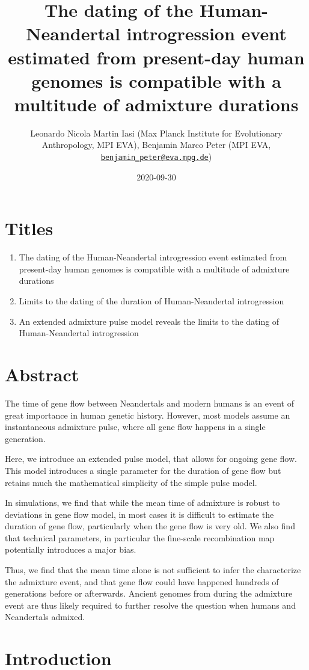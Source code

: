 \documentclass[]{article}
\title{The dating of the Human-Neandertal introgression event estimated from present-day human genomes is compatible with a multitude of admixture durations}
\author{Leonardo Nicola Martin Iasi (Max Planck Institute for Evolutionary
Anthropology, MPI EVA), Benjamin Marco Peter (MPI EVA,
\href{mailto:benjamin_peter@eva.mpg.de}{\nolinkurl{benjamin\_peter@eva.mpg.de}})}
\date{2020-09-30}
\begin{document}
\maketitle
\section{Titles}
\begin{enumerate}
    \item The dating of the Human-Neandertal introgression event estimated from present-day human genomes is compatible with a multitude of admixture durations
    \item Limits to the dating of the duration of Human-Neandertal introgression
    \item An extended admixture pulse model reveals the limits to the dating of Human-Neandertal introgression
\end{enumerate}
\section{Abstract}\label{abstract}
The time of gene flow between Neandertals and modern humans is an event of great importance in human genetic history. However, most models assume an instantaneous admixture pulse, where all gene flow happens in a single generation. 

Here, we introduce an extended pulse model, that allows for ongoing gene flow. This model introduces a single parameter for the duration of gene flow but retains much the mathematical simplicity of the simple pulse model. 

In simulations, we find that while the mean time of admixture is robust to deviations in gene flow model, in most cases it is difficult to estimate the duration of gene flow, particularly when the gene flow is very old. We also find that technical parameters, in particular the fine-scale recombination map potentially introduces a major bias.

Thus, we find that the mean time alone is not sufficient to infer the characterize the admixture event, and that gene flow could have happened hundreds of generations before or afterwards. Ancient genomes from during the admixture event are thus likely required to further resolve the question when humans and Neandertals admixed.

\section{Introduction}\label{introduction}
\end{document}
